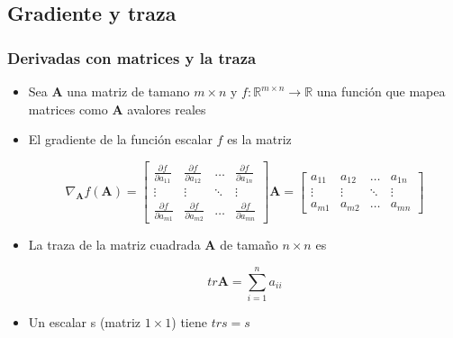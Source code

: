 \documentclass{beamer}
\begin{document}
\subsection{Gradiente y traza}
\begin{frame}
\frametitle{Derivadas con matrices y la traza}
\begin{itemize}
\item Sea $\boldsymbol{A}$ una matriz de tamano $m\times n$ y $f:\mathbb{R}^{m\times n} \rightarrow \mathbb{R}$ una función que mapea matrices como $\boldsymbol{A}$ avalores reales 

\item El gradiente de la función escalar $f$ es la matriz
 
\begin{equation*}
\nabla_{\boldsymbol{A}}f(\boldsymbol{A})= \begin{bmatrix} \frac{\partial f}{\partial a_{11}} & \frac{\partial f}{\partial a_{12}} & \dots & \frac{\partial f}{\partial a_{1n}} \\ \vdots &  \vdots & \ddots & \vdots \\ \frac{\partial f}{\partial a_{m1}} &  \frac{\partial f}{\partial a_{m2}} & \dots & \frac{\partial f}{\partial a_{mn}} \end{bmatrix}  \boldsymbol{A} =  \begin{bmatrix} a_{11} &  a_{12} & \dots & a_{1n} \\ \vdots &  \vdots & \ddots & \vdots \\ a_{m1} &  a_{m2} & \dots & a_{mn} \end{bmatrix}
\end{equation*}

\item La traza de la matriz cuadrada $\boldsymbol{A}$ de tamaño $n\times n$ es 

\begin{equation*}
tr \boldsymbol{A}= \sum_{i=1}^{n}a_{ii}
\end{equation*}
\item Un escalar s (matriz $1\times 1$) tiene $tr s =s$
\end{itemize}
\end{frame}
\end{document}
